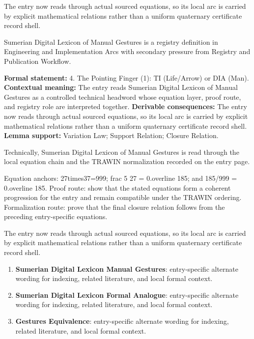 The entry now reads through actual sourced equations, so its local arc is carried by explicit mathematical relations rather than a uniform quaternary certificate record shell.
\clearpage


\begingroup\small
{}
Sumerian Digital Lexicon of Manual Gestures is a registry definition in Engineering and Implementation Arcs with secondary pressure from Registry and Publication Workflow.

\begingroup\footnotesize\setlength{\emergencystretch}{3em}\sloppy
\textbf{Formal statement:} 4. The Pointing Finger (1): TI (Life/Arrow) or DIA (Man). \textbf{Contextual meaning:} The entry reads Sumerian Digital Lexicon of Manual Gestures as a controlled technical headword whose equation layer, proof route, and registry role are interpreted together. \textbf{Derivable consequences:} The entry now reads through actual sourced equations, so its local arc is carried by explicit mathematical relations rather than a uniform quaternary certificate record shell. \textbf{Lemma support:} Variation Law; Support Relation; Closure Relation.\par
\endgroup

Technically, Sumerian Digital Lexicon of Manual Gestures is read through the local equation chain and the TRAWIN normalization recorded on the entry page.

Equation anchors: 27times37=999; frac 5 27 = 0.overline 185; and 185/999 = 0.overline 185. Proof route: show that the stated equations form a coherent progression for the entry and remain compatible under the TRAWIN ordering. Formalization route: prove that the final closure relation follows from the preceding entry-specific equations.

The entry now reads through actual sourced equations, so its local arc is carried by explicit mathematical relations rather than a uniform quaternary certificate record shell.
\endgroup

\begin{enumerate}[leftmargin=1.6em,itemsep=6pt,topsep=4pt]
\item \textbf{Sumerian Digital Lexicon Manual Gestures}: entry-specific alternate wording for indexing, related literature, and local formal context.
\item \textbf{Sumerian Digital Lexicon Formal Analogue}: entry-specific alternate wording for indexing, related literature, and local formal context.
\item \textbf{Gestures Equivalence}: entry-specific alternate wording for indexing, related literature, and local formal context.
\end{enumerate}

